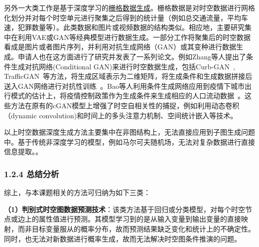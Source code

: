 \documentclass[12pt,UTF8,AutoFakeBold=2,a4paper]{ctexart} %
\begin{document}
另外一大类工作是基于深度学习的\underline{栅格数据生成}。栅格数据是对时空数据进行网格化划分并对每个时空单元进行聚集之后得到的统计量（例如总交通流量，平均车速，犯罪数量等）。此类数据和图片或视频数据的结构类似。相应地，主要研究集中在利用VAE或GAN等经典模型进行数据生成。一部分工作将聚集后的时空数据看成是图片或者图片序列，并利用对抗生成网络（GAN）或其变种进行数据生成。申请人也在这方面进行了研究并发表了一系列论文。例如Zhang等人提出了条件生成对抗网络(Conditional GAN)来进行时空数据生成，包括Curb-GAN~\cite{zhang2020curb}, TrafficGAN~\cite{zhang2019trafficgan}等方法，将生成区域表示为二维矩阵，将生成条件和生成数据拼接后送入GAN网络进行对抗性训练~\cite{zhang2021c,zhang2022mest,zhang2022strans}。Bao等人利用条件生成网络应用到疫情下城市出行模式的估计上，将疫情控制政策作为生成条件来生成相应的人口流动数据~\cite{bao2022covid,bao2020covid}。这些方法在原有的cGAN模型上增强了时空自相关性的捕捉，例如利用动态卷积（dynamic convolution)和时间上的多头注意力机制、空间统计嵌入等技术。


以上时空数据深度生成方法主要集中在非图结构上，无法直接应用到子图生成问题中。基于传统非深度学习的模型，例如马尔可夫随机场，无法对复杂数据进行直接信息提取。。


\subsubsection{1.2.4 总结分析}
综上，与本课题相关的方法可归纳为如下三类：

\textbf{（1）判别式时空图数据预测技术}：该类方法基于回归或分类模型，对每个时空节点或边上的属性值进行预测。其模型学习到的是从输入变量到输出变量的直接映射，而非目标变量服从的概率分布，故而预测结果缺乏变化和统计上的不确定性。同时，也无法对新数据进行概率生成，故而无法解决时空图条件推演的问题。
\end{document}
